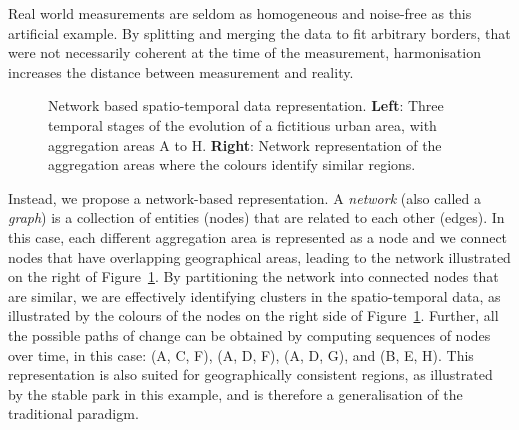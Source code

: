 Real world measurements are seldom as homogeneous and noise-free as this
artificial example. By splitting and merging the data to fit arbitrary borders,
that were not necessarily coherent at the time of the measurement, harmonisation
increases the distance between measurement and reality.


\begin{figure}
    \centering 
     \caption{Network based spatio-temporal data representation. \textbf{Left}:
    Three temporal stages of the evolution of a fictitious urban area, with
    aggregation areas A to H. \textbf{Right}: Network representation of the
    aggregation areas where the colours identify similar regions.
        \label{fig:intuition}}
\end{figure}

Instead, we propose a network-based representation. A \emph{network} (also
called a \emph{graph}) is a collection of entities (nodes) that are related to
each other (edges). In this case, each different aggregation area is represented
as a node and we connect nodes that have overlapping geographical areas, leading to the network
illustrated on the right of Figure~\ref{fig:intuition}. By partitioning the
network into connected nodes that are similar, we are effectively identifying
clusters in the spatio-temporal data, as illustrated by the colours of the nodes
on the right side of Figure~\ref{fig:intuition}. Further, all the possible paths
of change can be obtained by computing sequences of nodes over time, in this
case: (A, C, F), (A, D, F), (A, D, G), and (B, E, H). This representation is
also suited for geographically consistent regions, as illustrated by the stable
park in this example, and is therefore a generalisation of the traditional
paradigm.


